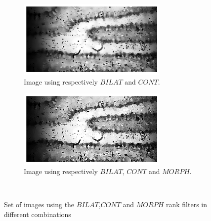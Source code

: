 \begin{figure}[h!]
    \begin{subfigure}[b]{0.5\textwidth}
        \centering
        \includegraphics[width=0.8\textwidth, frame]{afbeeldingen/rank/img_cont_bilat.png}
        \vspace{3mm}
        \caption{Image using respectively $BILAT$ and $CONT$.}
        \label{fig_rank_cont_bilat}
    \end{subfigure}
    \begin{subfigure}[b]{0.5\textwidth}
        \centering
        \includegraphics[width=0.8\textwidth, frame]{afbeeldingen/rank/img_morph_cont_bilat.png}
        \caption[width=1\textwidth]{Image using respectively $BILAT$, $CONT$ and $MORPH$.}
        \label{fig_rank_morph_cont_bilat}
    \end{subfigure}
\\

    \caption{Set of images using the $BILAT$,$CONT$ and $MORPH$ rank filters in different combinations}
	\label{fig_rank}
\end{figure}
\clearpage

